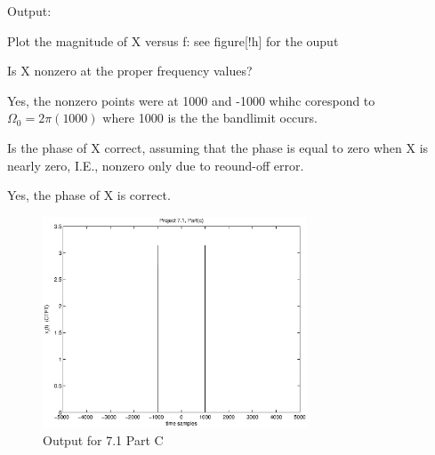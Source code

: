 {\LARGE Output:}

Plot the magnitude of X versus f: see {figure}[!h] for the ouput



 Is X nonzero at the proper frequency values? 

	Yes, the nonzero points were at 1000 and -1000 whihc corespond to $\Omega_0 =2\pi(1000)$ where 1000 is the the bandlimit occurs.


 Is the phase of X correct, assuming that the phase is equal to zero when X is nearly zero, I.E., nonzero only due to reound-off error.

	Yes, the phase of X is correct.

\begin{figure}[!htbp]
  \centering
    \includegraphics[width=0.7\textwidth]{Part1/Output/Figures/proj71PartC.eps}
  \caption{Output for 7.1 Part C}
\end{figure}

\pagebreak
